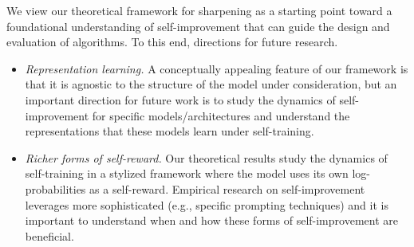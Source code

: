 We view our
theoretical framework for sharpening as a starting point toward a foundational
understanding of self-improvement that can guide the design and evaluation of algorithms. To this end,  directions
for future research.
\begin{itemize}
\item \emph{Representation learning.} A conceptually appealing feature
  of our framework is that it is agnostic to the
  structure of the model under consideration, but an important
  direction for future work is to study the dynamics of
  self-improvement for specific models/architectures and
  understand the representations that these models learn under
  self-training.
\item \emph{Richer forms of self-reward.} Our theoretical results study the
  dynamics of self-training in a stylized framework where the model
  uses its own log-probabilities as a self-reward. Empirical research on
  self-improvement leverages more sophisticated  (e.g., specific prompting
  techniques)
  \citep{huang2022large,wang2022self,bai2022constitutional,pang2023language,yuan2024self}
  and it is important to understand when and how these forms of
  self-improvement are beneficial.
\end{itemize}



